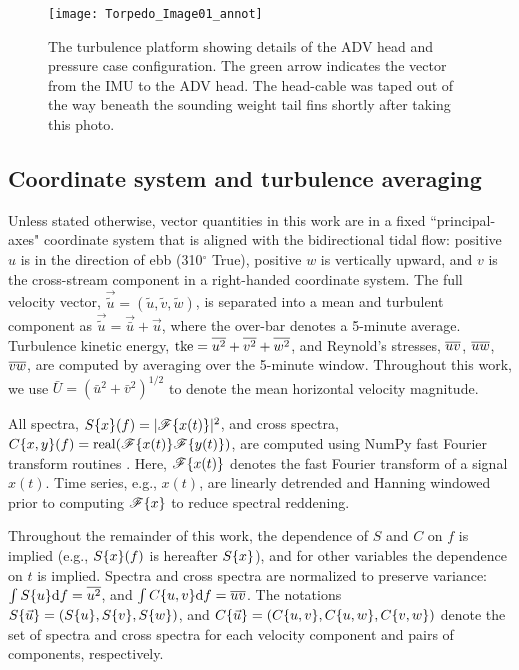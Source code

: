 \begin{figure}[th]
  \centering
  \texttt{[image: Torpedo\_Image01\_annot]}
  \caption{The turbulence platform showing details of the ADV head and pressure case configuration. The green arrow indicates the vector from the IMU to the ADV head. The head-cable was taped out of the way beneath the sounding weight tail fins shortly after taking this photo.}
  \label{fig:torpedo}
\end{figure}

\subsection{Coordinate system and turbulence averaging}

Unless stated otherwise, vector quantities in this work are in a fixed ``principal-axes" coordinate system that is aligned with the bidirectional tidal flow: positive $u$ is in the direction of ebb (310$^\circ$ True), positive $w$ is vertically upward, and $v$ is the cross-stream component in a right-handed coordinate system. The full velocity vector, $\vec{\tilde{u}} = (\tilde{u}, \tilde{v}, \tilde{w})$, is separated into a mean and turbulent component as $\vec{\tilde{u}} = \vec{\bar{u}} + \vec{u}$, where the over-bar denotes a 5-minute average. Turbulence kinetic energy, $\mathrm{tke} = \overline{u^2} + \overline{v^2}+\overline{w^2}$, and Reynold's stresses, $\overline{uv}$, $\overline{uw}$, $\overline{vw}$, are computed by averaging over the 5-minute window.  Throughout this work, we use $\bar{U} = (\bar{u}^2+\bar{v}^2)^{1/2}$ to denote the mean horizontal velocity magnitude. 
%
%


All spectra, $S\{x\}(f)=|\mathscr{F}\{x(t)\}|^2$, and cross spectra, $C\{x,y\}(f)=\mathrm{real}(\mathscr{F}\{x(t)\}\mathscr{F}\{y(t)\})$, are computed using NumPy fast Fourier transform routines \cite[]{Walt++2011}. Here, $\mathscr{F}\{x(t)\}$ denotes the fast Fourier transform of a signal $x(t)$. Time series, e.g., $x(t)$, are linearly detrended and Hanning windowed prior to computing $\mathscr{F}\{x\}$ to reduce spectral reddening.  

Throughout the remainder of this work, the dependence of $S$ and $C$ on $f$ is implied (e.g., $S\{x\}(f)$ is hereafter $S\{x\}$), and for other variables the dependence on $t$ is implied. Spectra and cross spectra are normalized to preserve variance: $\int S\{u\}\mathrm{d}f = \overline{u^2}$, and  $\int C\{u,v\}\mathrm{d}f = \overline{uv}$. The notations $S\{\vec{u}\}=(S\{u\}, S\{v\}, S\{w\})$, and $C\{\vec{u}\} = (C\{u,v\}, C\{u,w\}, C\{v,w\} )$ denote the set of spectra and cross spectra for each velocity component and pairs of components, respectively.

